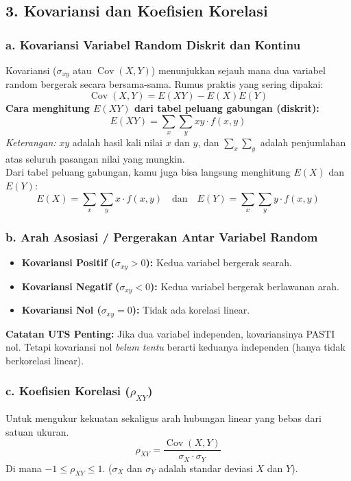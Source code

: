 \documentclass[12pt, a4paper]{article}
\begin{document}
\subsection{3. Kovariansi dan Koefisien Korelasi}
\subsubsection{a. Kovariansi Variabel Random Diskrit dan Kontinu}
Kovariansi ($\sigma_{xy}$ atau $\operatorname{Cov}(X, Y)$) menunjukkan sejauh mana dua variabel random bergerak secara bersama-sama. Rumus praktis yang sering dipakai:
$$\operatorname{Cov}(X,Y) = E(XY) - E(X)E(Y)$$
\textbf{Cara menghitung $E(XY)$ dari tabel peluang gabungan (diskrit):}
$$E(XY) = \sum_{x} \sum_{y} xy \cdot f(x,y)$$
\textit{Keterangan:} $xy$ adalah hasil kali nilai $x$ dan $y$, dan $\sum_{x} \sum_{y}$ adalah penjumlahan atas seluruh pasangan nilai yang mungkin. \\
Dari tabel peluang gabungan, kamu juga bisa langsung menghitung $E(X)$ dan $E(Y)$:
$$E(X) = \sum_{x} \sum_{y} x \cdot f(x,y) \quad \text{dan} \quad E(Y) = \sum_{x} \sum_{y} y \cdot f(x,y)$$

\subsubsection{b. Arah Asosiasi / Pergerakan Antar Variabel Random}
\begin{itemize}
    \item \textbf{Kovariansi Positif ($\sigma_{xy} > 0$):} Kedua variabel bergerak searah.
    \item \textbf{Kovariansi Negatif ($\sigma_{xy} < 0$):} Kedua variabel bergerak berlawanan arah.
    \item \textbf{Kovariansi Nol ($\sigma_{xy} = 0$):} Tidak ada korelasi linear.
\end{itemize}
\textbf{Catatan UTS Penting:} Jika dua variabel independen, kovariansinya PASTI nol. Tetapi kovariansi nol \textit{belum tentu} berarti keduanya independen (hanya tidak berkorelasi linear).

\subsubsection{c. Koefisien Korelasi ($\rho_{XY}$)}
Untuk mengukur kekuatan sekaligus arah hubungan linear yang bebas dari satuan ukuran.
$$\rho_{XY} = \frac{\operatorname{Cov}(X,Y)}{\sigma_X \cdot \sigma_Y}$$
Di mana $-1 \le \rho_{XY} \le 1$. ($\sigma_X$ dan $\sigma_Y$ adalah standar deviasi $X$ dan $Y$).
\end{document}
